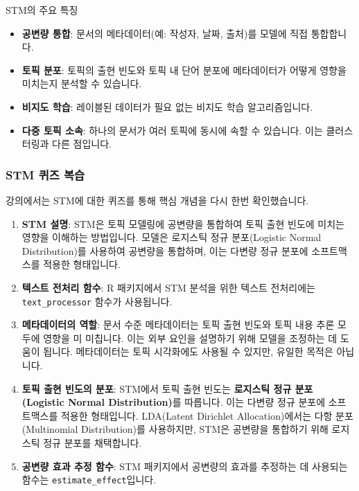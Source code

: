 \documentclass[11pt,a4paper]{article}
\begin{document}
\begin{summarybox}{STM의 주요 특징}
\begin{itemize}
    \item \textbf{공변량 통합}: 문서의 메타데이터(예: 작성자, 날짜, 출처)를 모델에 직접 통합합니다.
    \item \textbf{토픽 분포}: 토픽의 출현 빈도와 토픽 내 단어 분포에 메타데이터가 어떻게 영향을 미치는지 분석할 수 있습니다.
    \item \textbf{비지도 학습}: 레이블된 데이터가 필요 없는 비지도 학습 알고리즘입니다.
    \item \textbf{다중 토픽 소속}: 하나의 문서가 여러 토픽에 동시에 속할 수 있습니다. 이는 클러스터링과 다른 점입니다.
\end{itemize}
\end{summarybox}

\subsubsection{STM 퀴즈 복습}

강의에서는 STM에 대한 퀴즈를 통해 핵심 개념을 다시 한번 확인했습니다.

\begin{enumerate}
    \item \textbf{STM 설명}: STM은 토픽 모델링에 공변량을 통합하여 토픽 출현 빈도에 미치는 영향을 이해하는 방법입니다. 모델은 로지스틱 정규 분포(Logistic Normal Distribution)를 사용하여 공변량을 통합하며, 이는 다변량 정규 분포에 소프트맥스를 적용한 형태입니다.
    \item \textbf{텍스트 전처리 함수}: R 패키지에서 STM 분석을 위한 텍스트 전처리에는 \texttt{text\_processor} 함수가 사용됩니다.
    \item \textbf{메타데이터의 역할}: 문서 수준 메타데이터는 토픽 출현 빈도와 토픽 내용 추론 모두에 영향을 미 미칩니다. 이는 외부 요인을 설명하기 위해 모델을 조정하는 데 도움이 됩니다. 메타데이터는 토픽 시각화에도 사용될 수 있지만, 유일한 목적은 아닙니다.
    \item \textbf{토픽 출현 빈도의 분포}: STM에서 토픽 출현 빈도는 \textbf{로지스틱 정규 분포(Logistic Normal Distribution)}를 따릅니다. 이는 다변량 정규 분포에 소프트맥스를 적용한 형태입니다. LDA(Latent Dirichlet Allocation)에서는 다항 분포(Multinomial Distribution)를 사용하지만, STM은 공변량을 통합하기 위해 로지스틱 정규 분포를 채택합니다.
    \item \textbf{공변량 효과 추정 함수}: STM 패키지에서 공변량의 효과를 추정하는 데 사용되는 함수는 \texttt{estimate\_effect}입니다.
\end{enumerate}
\end{document}
